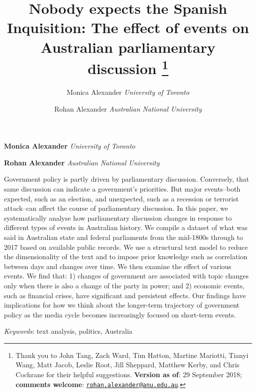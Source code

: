 \documentclass[12pt,]{article}
\title{Nobody expects the Spanish Inquisition: The effect of events on
Australian parliamentary discussion \thanks{Thank you to John Tang, Zach Ward, Tim Hatton, Martine Mariotti, Tianyi
Wang, Matt Jacob, Leslie Root, Jill Sheppard, Matthew Kerby, and Chris
Cochrane for their helpful suggestions. \textbf{Version as of}: 29
September 2018; \textbf{comments welcome}:
\href{mailto:rohan.alexander@anu.edu.au}{\nolinkurl{rohan.alexander@anu.edu.au}}.}  }
\author{\Large Monica Alexander\vspace{0.05in} \newline\normalsize\emph{University of Toronto}   \and \Large Rohan Alexander\vspace{0.05in} \newline\normalsize\emph{Australian National University}  }
\date{}
\newcommand*{\authorfont}{\fontfamily{phv}\selectfont}
\renewenvironment{abstract}
 {{%
    \setlength{\leftmargin}{0mm}
    \setlength{\rightmargin}{\leftmargin}%
  }%
  \relax}
 {\endlist}
\theoremstyle{definition}
\theoremstyle{definition}
\theoremstyle{definition}
\theoremstyle{remark}
\begin{document}
	
%

{%
\setlength{\parindent}{0pt}
\thispagestyle{plain}
{\fontsize{18}{20}\selectfont\raggedright 
\maketitle  %

}

{
   \vskip 13.5pt\relax \normalsize\fontsize{11}{12} 
\textbf{\authorfont Monica Alexander} \hskip 15pt \emph{\small University of Toronto}   \par \textbf{\authorfont Rohan Alexander} \hskip 15pt \emph{\small Australian National University}   

}

}








\begin{abstract}

    \hbox{\vrule height .2pt width 39.14pc}

    \vskip 8.5pt %

\noindent Government policy is partly driven by parliamentary discussion.
Conversely, that same discussion can indicate a government's priorities.
But major events--both expected, such as an election, and unexpected,
such as a recession or terrorist attack--can affect the course of
parliamentary discussion. In this paper, we systematically analyse how
parliamentary discussion changes in response to different types of
events in Australian history. We compile a dataset of what was said in
Australian state and federal parliaments from the mid-1800s through to
2017 based on available public records. We use a structural text model
to reduce the dimensionality of the text and to impose prior knowledge
such as correlation between days and changes over time. We then examine
the effect of various events. We find that: 1) changes of government are
associated with topic changes only when there is also a change of the
party in power; and 2) economic events, such as financial crises, have
significant and persistent effects. Our findings have implications for
how we think about the longer-term trajectory of government policy as
the media cycle becomes increasingly focused on short-term events.


\vskip 8.5pt \noindent \emph{Keywords}: text analysis, politics, Australia \par

    \hbox{\vrule height .2pt width 39.14pc}



\end{abstract}
\end{document}

